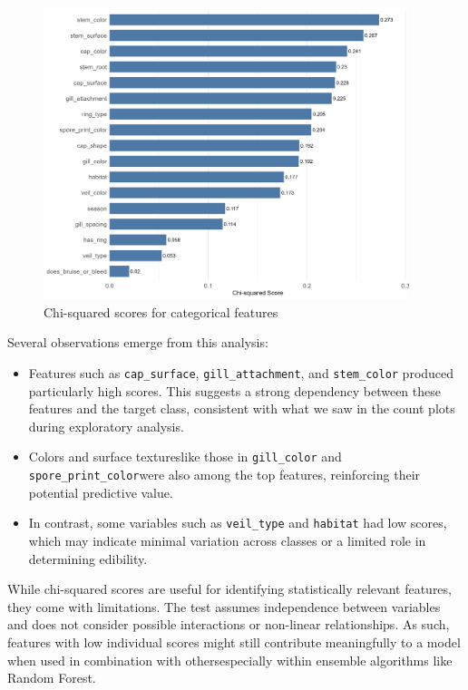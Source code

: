 \documentclass[a4paper,11pt]{article}
\begin{document}
\begin{figure}[h]
\centering
\includegraphics[width=0.95\textwidth]{Figure3-bar-chart.png}
\caption{Chi-squared scores for categorical features}
\label{fig:chi}
\end{figure}

Several observations emerge from this analysis:
\begin{itemize}
  \item Features such as \texttt{cap\_surface}, \texttt{gill\_attachment}, and \texttt{stem\_color} produced particularly high scores. This suggests a strong dependency between these features and the target class, consistent with what we saw in the count plots during exploratory analysis.
  \item Colors and surface textures\textemdash like those in \texttt{gill\_color} and \texttt{spore\_print\_color}\textemdash were also among the top features, reinforcing their potential predictive value.
  \item In contrast, some variables such as \texttt{veil\_type} and \texttt{habitat} had low scores, which may indicate minimal variation across classes or a limited role in determining edibility.
\end{itemize}

While chi-squared scores are useful for identifying statistically relevant features, they come with limitations. The test assumes independence between variables and does not consider possible interactions or non-linear relationships. As such, features with low individual scores might still contribute meaningfully to a model when used in combination with others\textemdash especially within ensemble algorithms like Random Forest.
\end{document}
